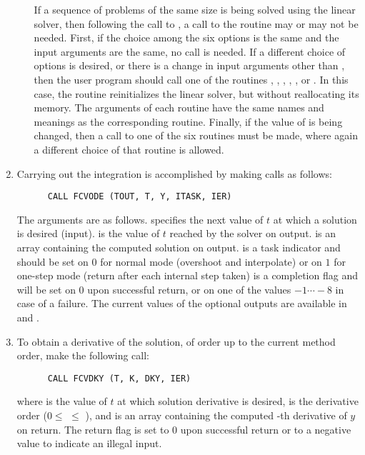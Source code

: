\begin{enumerate}
\begin{itemize}
    If a sequence of problems of the same size is being solved using the {\spgmr}
    linear solver, then following the call to , a call to the 
     routine may or may not be needed.  
    First, if the choice among the six {\spgmr} options is the same and the 
    input arguments are the same, no  call is needed.  
    If a different choice of options is desired, or there is a change
    in input arguments other than , then the user program should call one of
    the routines , , , 
    , , or .  
    In this case, the  routine
    reinitializes the {\spgmr} linear solver, but without reallocating its memory.
    The arguments of each  routine have the same names and meanings
    as the corresponding  routine.  Finally, if the value of  is
    being changed, then a call to one of the six  routines must be made,
    where again a different choice of that routine is allowed.  
  \end{itemize}    

\item
  Carrying out the integration is accomplished by making calls as follows:
\begin{verbatim}
      CALL FCVODE (TOUT, T, Y, ITASK, IER)
\end{verbatim}
  The arguments are as follows.
   specifies the next value of $t$ at which a solution is desired (input).
   is the value of $t$ reached by the solver on output.
   is an array containing the computed solution on output.
   is a task indicator and should be set on $0$ for normal mode 
  (overshoot  and interpolate) or on $1$ for one-step mode 
  (return after each internal step taken)
   is a completion flag and will be set on $0$ upon successful return, or
  on one of the values $-1 \cdots -8$ in case of a failure.
  The current values of the optional outputs are available in  and .
  
\item
  To obtain a derivative of the solution, of order up to the current method
  order, make the following call:
\begin{verbatim}
      CALL FCVDKY (T, K, DKY, IER)
\end{verbatim}
  where
   is the value of $t$ at which solution derivative is desired,
   is the derivative order ($0 \le$  $\le$ ), and
   is an array containing the computed -th derivative of $y$ on return.
  The return flag  is set to $0$ upon successful return or to a negative
  value to indicate an illegal input.
  

\end{enumerate}
